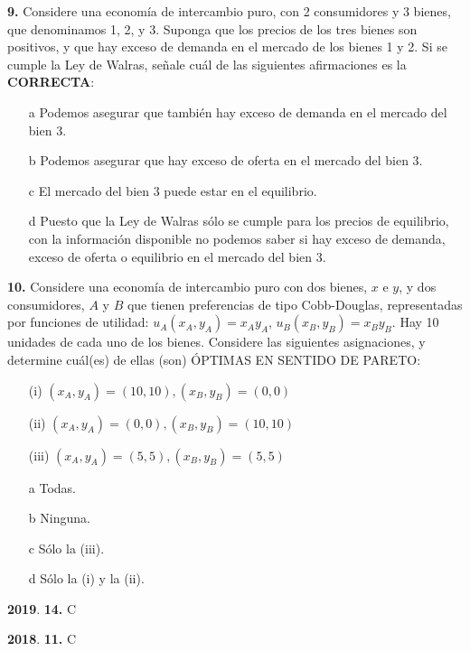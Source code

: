 \documentclass{nuevotema}
\begin{document}
\textbf{9.} Considere una economía de intercambio puro, con 2 consumidores y 3 bienes, que denominamos 1, 2, y 3. Suponga que los precios de los tres bienes son positivos, y que hay exceso de demanda en el mercado de los bienes 1 y 2. Si se cumple la Ley de Walras, señale cuál de las siguientes afirmaciones es la \textbf{CORRECTA}:

\begin{itemize}
	\item[a] Podemos asegurar que también hay exceso de demanda en el mercado del bien 3.
	\item[b] Podemos asegurar que hay exceso de oferta en el mercado del bien 3.
	\item[c] El mercado del bien 3 puede estar en el equilibrio.
	\item[d] Puesto que la Ley de Walras sólo se cumple para los precios de equilibrio, con la información disponible no podemos saber si hay exceso de demanda, exceso de oferta o equilibrio en el mercado del bien 3.
\end{itemize}

\textbf{10.} Considere una economía de intercambio puro con dos bienes, $x$ e $y$, y dos consumidores, $A$ y $B$ que tienen preferencias de tipo Cobb-Douglas, representadas por funciones de utilidad: $u_A (x_A, y_A) = x_A y_A$, $u_B(x_B, y_B) = x_B y_B$. Hay 10 unidades de cada uno de los bienes. Considere las siguientes asignaciones, y determine cuál(es) de ellas (son) ÓPTIMAS EN SENTIDO DE PARETO:

\begin{itemize}
	\item[(i)] $(x_A, y_A)  = (10,10), (x_B, y_B) = (0,0)$
	\item[(ii)] $(x_A, y_A) = (0,0), (x_B, y_B) = (10,10)$
	\item[(iii)] $(x_A, y_A) = (5,5), (x_B, y_B) = (5,5)$
\end{itemize}

\begin{itemize}
	\item[a] Todas.
	\item[b] Ninguna. 
	\item[c] Sólo la (iii).
	\item[d] Sólo la (i) y la (ii).
\end{itemize}

\notas

\textbf{2019}. \textbf{14.} C

\textbf{2018}. \textbf{11.} C
\end{document}
